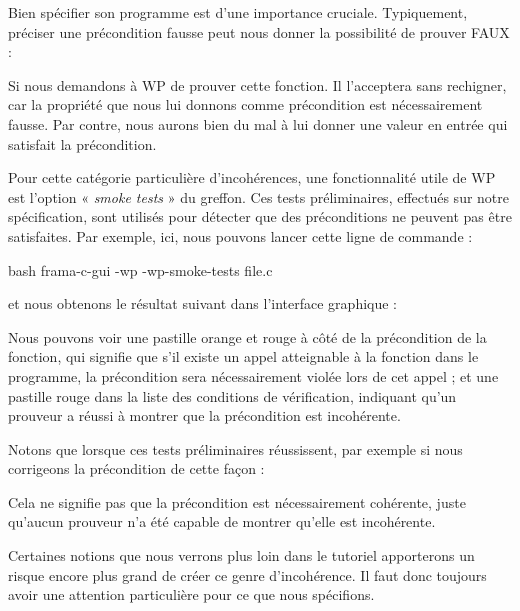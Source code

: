 

Bien spécifier son programme est d'une importance cruciale. Typiquement,
préciser une précondition fausse peut nous donner la possibilité de prouver
FAUX :




Si nous demandons à WP de prouver cette fonction. Il l'acceptera sans rechigner,
car la propriété que nous lui donnons comme précondition est nécessairement fausse.
Par contre, nous aurons bien du mal à lui donner une valeur en entrée qui satisfait
la précondition.


Pour cette catégorie particulière d'incohérences, une fonctionnalité utile de WP
est l'option « \textit{smoke tests} » du greffon. Ces tests préliminaires, effectués
sur notre spécification, sont utilisés pour détecter que des préconditions ne peuvent
pas être satisfaites. Par exemple, ici, nous pouvons lancer cette ligne de
commande :


\begin{CodeBlock}{bash}
  frama-c-gui -wp -wp-smoke-tests file.c
\end{CodeBlock}


et nous obtenons le résultat suivant dans l'interface graphique :




Nous pouvons voir une pastille orange et rouge à côté de la précondition de la
fonction, qui signifie que s'il existe un appel atteignable à la fonction dans
le programme, la précondition sera nécessairement violée lors de cet appel ; et
une pastille rouge dans la liste des conditions de vérification, indiquant qu'un
prouveur a réussi à montrer que la précondition est incohérente.


Notons que lorsque ces tests préliminaires réussissent, par exemple si
nous corrigeons la précondition de cette façon :




Cela ne signifie pas que la précondition est nécessairement cohérente, juste
qu'aucun prouveur n'a été capable de montrer qu'elle est incohérente.


Certaines notions que nous verrons plus loin dans le tutoriel apporterons un
risque encore plus grand de créer ce genre d'incohérence. Il faut donc toujours
avoir une attention particulière pour ce que nous spécifions.





